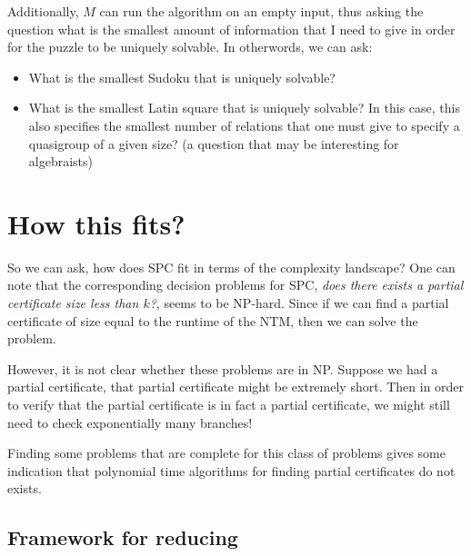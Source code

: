 \documentclass[runningheads,a4paper]{llncs}
\begin{document}
Additionally, $M$ can run the algorithm on an empty input, thus asking the question what is the smallest amount of information that I need to give in order for the puzzle to be uniquely solvable. In otherwords, we can ask:
\begin{itemize}
\item What is the smallest Sudoku that is uniquely solvable?
\item What is the smallest Latin square that is uniquely solvable? In this case, this also specifies the smallest number of relations that one must give to specify a quasigroup of a given size? (a question that may be interesting for algebraists)
\end{itemize}

\section{How this fits?}

So we can ask, how does SPC fit in terms of the complexity landscape? One can note that the corresponding decision problems for SPC, \emph{does there exists a partial certificate size less than $k$?}, seems to be NP-hard. Since if we can find a partial certificate of size equal to the runtime of the NTM, then we can solve the problem.

However, it is not clear whether these problems are in NP. Suppose we had a partial certificate, that partial certificate might be extremely short. Then in order to verify that the partial certificate is in fact a partial certificate, we might still need to check exponentially many branches! 

Finding some problems that are complete for this class of problems gives some indication that polynomial time algorithms for finding partial certificates do not exists.

\subsection{Framework for reducing}
\end{document}
